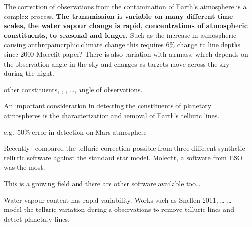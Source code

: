 The correction of observations from the contamination of Earth's atmosphere is a complex process.\textbf{
The transmission is variable on many different time scales, the water vapour change is rapid, concentrations of atmospheric constituents, to seasonal and longer.}
Such as the increase in atmospheric  causing anthropamorphic climate change this requires 6\% change to  line depths since 2000 Molecfit paper?
There is also variation with airmass, which depends on the observation angle in the sky and changes as targets move across the sky during the night.

other constituents, , ,  \ldots{}, angle of observations.

An important consideration in detecting the constituents of planetary atmospheres is the characterization and removal of Earth's telluric lines.

e.g.\ 50\% error in  detection on Mars atmosphere


Recently~\citet{ulmer-moll_telluric_2018} compared the telluric correction possible from three different synthetic telluric software against the standard star model.
Molecfit, a software from ESO was the most.

This is a growing field and there are other software available too\ldots{}


Water vapour content has rapid variability.
Works such as Snellen 2011, \ldots{} \ldots{} model the telluric variation during a observations to remove telluric lines and detect planetary lines.



